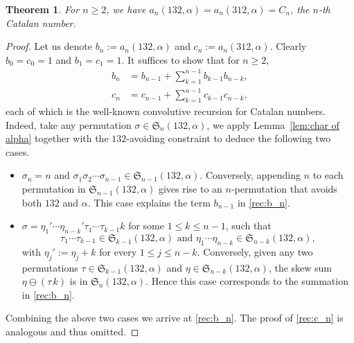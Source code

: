 \documentclass[12pt]{amsart}
\numberwithin{equation}{section}
\theoremstyle{plain}
\newtheorem{theorem}{Theorem}[section]
\def\fS{\mathfrak{S}}
\begin{document}
\begin{theorem}\label{thm:132-alpha}
For $n\ge 2$, we have $a_n(132,\alpha)=a_n(312,\alpha)=C_n$, the $n$-th Catalan number.
\end{theorem}
\begin{proof}
Let us denote $b_n:=a_n(132,\alpha)$ and $c_n:=a_n(312,\alpha)$. Clearly $b_0=c_0=1$ and $b_1=c_1=1$. It suffices to show that for $n\ge 2$,
\begin{align}
	b_n &= b_{n-1}+\sum_{k=1}^{n-1} b_{k-1}b_{n-k},\label{rec:b_n}\\
	c_n &= c_{n-1}+\sum_{k=1}^{n-1} c_{k-1}c_{n-k},\label{rec:c_n}
\end{align}
each of which is the well-known convolutive recursion for Catalan numbers. Indeed, take any permutation $\sigma\in\fS_n(132,\alpha)$, we apply Lemma~\ref{lem:char of alpha} together with the $132$-avoiding constraint to deduce the following two cases. 
\begin{itemize}
	\item $\sigma_n=n$ and $\sigma_1\sigma_2\cdots\sigma_{n-1}\in\fS_{n-1}(132,\alpha)$. Conversely, appending $n$ to each permutation in $\fS_{n-1}(132,\alpha)$ gives rise to an $n$-permutation that avoids both $132$ and $\alpha$. This case explains the term $b_{n-1}$ in \eqref{rec:b_n}.
	\item $\sigma=\eta_1'\cdots\eta_{n-k}'\tau_{1}\cdots\tau_{k-1}k$ for some $1\le k\le n-1$, such that 
	$$\tau_1\cdots\tau_{k-1}\in\fS_{k-1}(132,\alpha) \text{ and } \eta_1\cdots\eta_{n-k}\in\fS_{n-k}(132,\alpha),$$ 
	with $\eta_j':=\eta_j+k$ for every $1\le j\le n-k$. Conversely, given any two permutations $\tau\in\fS_{k-1}(132,\alpha)$ and $\eta\in\fS_{n-k}(132,\alpha)$, the skew sum $\eta\ominus(\tau\, k)$ is in $\fS_n(132,\alpha)$. Hence this case corresponds to the summation in \eqref{rec:b_n}.
\end{itemize}
Combining the above two cases we arrive at \eqref{rec:b_n}. The proof of \eqref{rec:c_n} is analogous and thus omitted.
\end{proof}
\end{document}
